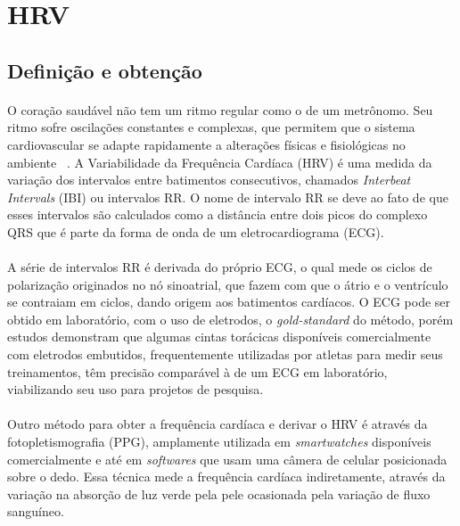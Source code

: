 
    \section{HRV}
    \label{HRV}
        
        \subsection {Definição e obtenção}
        \paragraph{} O coração saudável não tem um ritmo regular como o de um metrônomo. Seu ritmo sofre oscilações constantes e complexas, que permitem que o sistema cardiovascular se adapte rapidamente a alterações físicas e fisiológicas no ambiente ~\cite{Hansen2004HeartDetraining}. A Variabilidade da Frequência Cardíaca (HRV) é uma medida da variação dos intervalos entre batimentos consecutivos, chamados \textit{Interbeat Intervals} (IBI) ou intervalos RR. O nome de intervalo RR se deve ao fato de que esses intervalos são calculados como a distância entre dois picos do complexo QRS que é parte da forma de onda de um eletrocardiograma (ECG). ~\cite{TaskForceoftheEuropeanSocietyofCardiologytheNorthAmericanSocietyofPacing1996HeartUse}
        
        \paragraph{} A série de intervalos RR é derivada do próprio ECG, o qual mede os ciclos de polarização originados no nó sinoatrial, que fazem com que o átrio e o ventrículo se contraiam em ciclos, dando origem aos batimentos cardíacos. O ECG pode ser obtido em laboratório, com o uso de eletrodos, o \textit{gold-standard} do método, porém estudos \cite{Plews2017ComparisonMethods, Giles2016ValidityRest.} demonstram que algumas cintas torácicas disponíveis comercialmente com eletrodos embutidos, frequentemente utilizadas por atletas para medir seus treinamentos, têm precisão comparável à de um ECG em laboratório, viabilizando seu uso para projetos de pesquisa. 
        
        \paragraph{} Outro método para obter a frequência cardíaca e derivar o HRV é através da fotopletismografia (PPG), amplamente utilizada em \textit{smartwatches} disponíveis comercialmente e até em \textit{softwares} que usam uma câmera de celular posicionada sobre o dedo. Essa técnica mede a frequência cardíaca indiretamente, através da variação na absorção de luz verde pela pele ocasionada pela variação de fluxo sanguíneo. 
       
